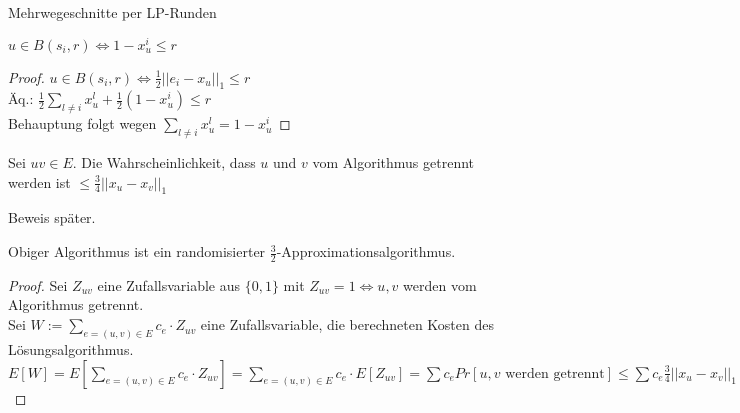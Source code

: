 \begin{section}{Mehrwegeschnitte per LP-Runden}
  \begin{lemma}
   $u \in B(s_i,r) \Leftrightarrow 1-x_u^i \leq r$
  \end{lemma}
  \begin{proof}
    $u \in B(s_i,r) \Leftrightarrow \frac{1}{2}||e_i-x_u||_1 \leq r$\\
    Äq.: $\frac{1}{2}\sum_{l\neq i} x_u^l + \frac{1}{2}(1-x_u^i) \leq r$\\
    Behauptung folgt wegen $\sum_{l\neq i} x_u^l = 1- x_u^i$
  \end{proof}
  \begin{lemma}
   Sei $uv \in E$. Die Wahrscheinlichkeit, dass $u$ und $v$ vom Algorithmus getrennt werden ist $\leq \frac{3}{4}||x_u-x_v||_1$
  \end{lemma}
  Beweis später.\\
  \begin{satz}
   Obiger Algorithmus ist ein randomisierter $\frac{3}{2}$-Approximationsalgorithmus.
  \end{satz}
  \begin{proof}
    Sei $Z_{uv}$ eine Zufallsvariable aus $\{0,1\}$ mit $Z_{uv} = 1 \Leftrightarrow u,v$ werden vom Algorithmus getrennt.\\
    Sei $W := \sum_{e=(u,v)\in E} c_e\cdot Z_{uv}$ eine Zufallsvariable, die berechneten Kosten des Lösungsalgorithmus.\\
    $E[W] = E[\sum_{e=(u,v)\in E} c_e\cdot Z_{uv}] = \sum_{e=(u,v)\in E} c_e\cdot E[Z_{uv}] = \sum c_e Pr[u,v\text{ werden getrennt}] \leq  \sum c_e \frac{3}{4}||x_u-x_v||_1=\frac{1}{2}\cdot \frac{3}{2}\sum c_e ||x_u-x_v||_1 \leq \frac{3}{2}OPT$
  \end{proof}
\end{section}

